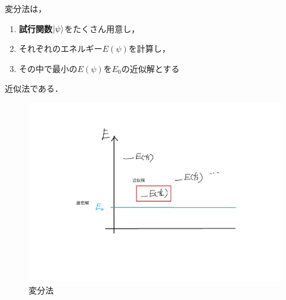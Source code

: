 \documentclass{report}
\begin{document}
  変分法は，
  \begin{screen}
    \begin{enumerate}
      \item \textbf{試行関数}$\ket{\psi}$をたくさん用意し，
      \item それぞれのエネルギー$E(\psi)$を計算し，
      \item その中で最小の$E(\psi)$を$E_0$の近似解とする
    \end{enumerate}
  \end{screen}
  近似法である．

  \begin{figure}[H]
    \centering
    \includegraphics[width=0.6\columnwidth]{fig/variational_pmethod.pdf}
    \caption{変分法}
    \label{variational-image}
  \end{figure}
\end{document}

